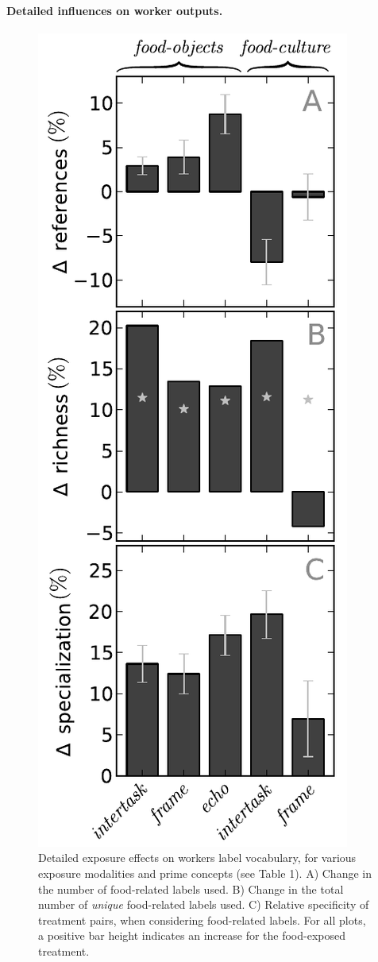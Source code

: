 \documentclass[12pt]{article}
\begin{document}
\paragraph{Detailed influences on worker outputs.} 
\begin{figure}
	\centering
	\includegraphics[scale=1]{figs/vocab_specificity.pdf}
	\caption{
		Detailed exposure effects on workers label vocabulary, for various
		exposure modalities and prime concepts (see Table 1).  A) Change in 
		the number of food-related labels used. B) Change in the total number 
		of \textit{unique} food-related labels used. C) Relative specificity
		of treatment pairs, when considering food-related labels.  For all
		plots, a positive bar height indicates an increase for the 
		food-exposed treatment.
	}
	\label{fig:specificity}
\end{figure}
\end{document}
